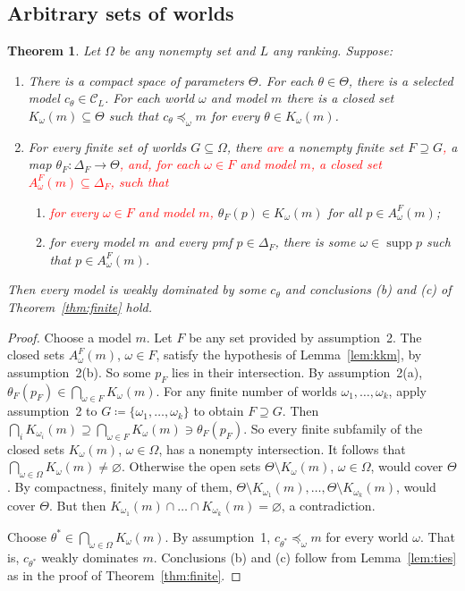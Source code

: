 \documentclass[11pt]{article}
\newtheorem{theorem}{Theorem}[section]
\theoremstyle{definition}
\newcommand{\C}{\mathcal C}
\newcommand{\supp}{\operatorname{supp}}
\newcommand{\new}[1]{\textcolor{red}{#1}}
\begin{document}
\subsection{Arbitrary sets of worlds}

\begin{theorem}\label{thm:local}
Let $\Omega$ be any nonempty set and $L$ any ranking. Suppose:
\begin{enumerate}[label=\arabic*.,leftmargin=*]
\item There is a compact space of parameters $\Theta$. For each $\theta\in\Theta$, there is a selected model $c_\theta\in\C_L$. For each world $\omega$ and model $m$ there is a closed set $K_\omega(m)\subseteq\Theta$ such that $c_\theta\preceq_\omega m$ for every $\theta\in K_\omega(m)$.
\item For every finite set of worlds $G\subseteq\Omega$, there \new{are} a nonempty finite set $F\supseteq G$\new{,} a map $\theta_F:\Delta_F\to\Theta$\new{, and, for each $\omega\in F$ and model $m$, a closed set $A^F_\omega(m)\subseteq\Delta_F$, such that}
\begin{enumerate}[label=(\alph*)]
\item \new{for every $\omega\in F$ and model $m$,} $\theta_F(p)\in K_\omega(m)$ for all $p\in A^F_\omega(m)$;
\item for every model $m$ and every pmf $p\in\Delta_F$, there is some $\omega\in\supp p$ such that $p\in A^F_\omega(m)$.
\end{enumerate}
\end{enumerate}
Then every model is weakly dominated by some $c_\theta$ and conclusions (b) and (c) of Theorem~\ref{thm:finite} hold.
\end{theorem}
\begin{proof}
Choose a model $m$. Let $F$ be any set provided by assumption~2. The closed sets $A^F_\omega(m)$, $\omega\in F$, satisfy the hypothesis of Lemma~\ref{lem:kkm}, by assumption~2(b). So some $p_F$ lies in their intersection. By assumption~2(a), $\theta_F(p_F)\in\bigcap_{\omega\in F}K_\omega(m)$. For any finite number of worlds $\omega_1,\dots,\omega_k$, apply assumption~2 to $G\coloneqq\{\omega_1,\dots,\omega_k\}$ to obtain $F\supseteq G$. Then $\bigcap_iK_{\omega_i}(m)\supseteq\bigcap_{\omega\in F}K_\omega(m)\ni\theta_F(p_F)$. So every finite subfamily of the closed sets $K_\omega(m)$, $\omega\in\Omega$, has a nonempty intersection. It follows that $\bigcap_{\omega\in\Omega}K_\omega(m)\ne\varnothing$. Otherwise the open sets $\Theta\setminus K_\omega(m)$, $\omega\in\Omega$, would cover $\Theta$. By compactness, finitely many of them, $\Theta\setminus K_{\omega_1}(m),\dots,\Theta\setminus K_{\omega_k}(m)$, would cover $\Theta$. But then $K_{\omega_1}(m)\cap\dots\cap K_{\omega_k}(m)=\varnothing$, a contradiction. 

Choose $\theta^*\in\bigcap_{\omega\in\Omega}K_\omega(m)$. By assumption~1, $c_{\theta^*}\preceq_\omega m$ for every world $\omega$. That is, $c_{\theta^*}$ weakly dominates $m$. Conclusions (b) and (c) follow from Lemma~\ref{lem:ties} as in the proof of Theorem~\ref{thm:finite}.
\end{proof}
\end{document}
